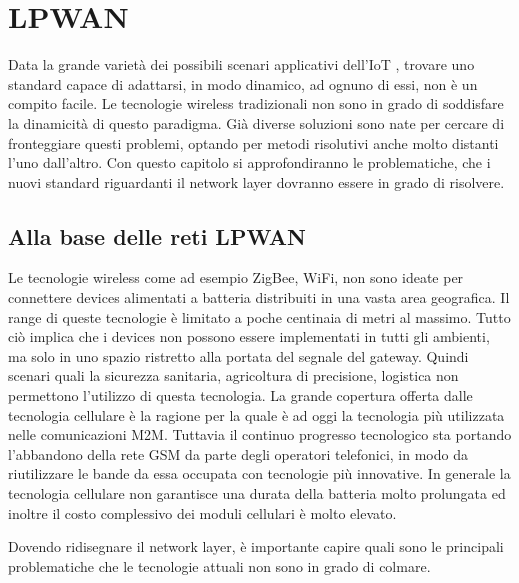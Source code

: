 \chapter{LPWAN}
Data la grande varietà dei possibili scenari applicativi dell'IoT , trovare uno standard
capace di adattarsi, in modo dinamico, ad ognuno di essi, non è un compito
facile. Le tecnologie wireless tradizionali non sono in grado di soddisfare
la dinamicità  di questo paradigma.
Già diverse soluzioni sono nate per cercare di fronteggiare questi
problemi, optando per metodi risolutivi  anche molto distanti l'uno dall'altro.
Con questo capitolo si approfondiranno le problematiche, che i nuovi standard riguardanti il
network layer dovranno essere in grado di risolvere.
\section{Alla base delle reti LPWAN}  
Le tecnologie wireless come ad esempio ZigBee, WiFi, non sono ideate per connettere devices
alimentati a batteria distribuiti in una vasta area geografica.
Il range di queste tecnologie è limitato a poche centinaia di metri al massimo.
Tutto ciò implica che i devices non possono essere implementati in tutti gli
ambienti, ma solo in uno spazio ristretto alla portata del segnale del gateway.
Quindi scenari quali la sicurezza sanitaria, agricoltura di precisione, logistica non
permettono l'utilizzo di questa tecnologia.
La grande copertura offerta dalle tecnologia cellulare è la ragione per la quale
è ad oggi la tecnologia più utilizzata nelle comunicazioni M2M.
Tuttavia il continuo progresso tecnologico sta portando l'abbandono della rete
GSM da parte degli operatori telefonici, in modo da riutilizzare le bande da essa
occupata con tecnologie più innovative. In generale la tecnologia cellulare non
garantisce una durata della batteria molto prolungata ed inoltre il costo
complessivo dei moduli cellulari è molto elevato.

Dovendo ridisegnare il network layer, è importante capire quali sono le
principali problematiche che le tecnologie attuali non sono in grado di colmare.

